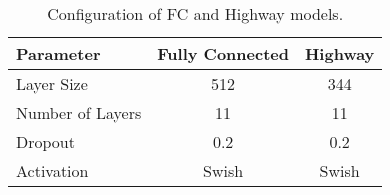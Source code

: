 \begin{table}[h]
    \centering
    \caption{Configuration of FC and Highway models.}
    \label{tab:fc_config}
    \begin{tabular}{@{}lcc@{}}
    \toprule
    \textbf{Parameter} & \textbf{Fully Connected} & \textbf{Highway} \\ \midrule
    Layer Size & 512 & 344 \\
    Number of Layers & 11 & 11 \\
    Dropout & 0.2 & 0.2 \\
    Activation & Swish & Swish \\
    \bottomrule
    \end{tabular}
\end{table}